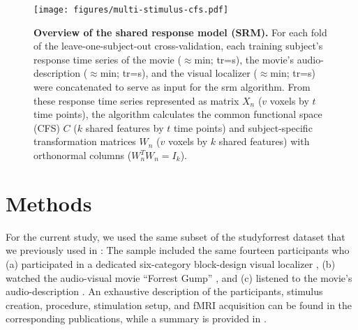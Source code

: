 
\begin{figure*}[tbp]
\centering
\texttt{[image: figures/multi-stimulus-cfs.pdf]}
\caption{
%
    \textbf{Overview of the shared response model (SRM).
}
    For each fold of the leave-one-subject-out cross-validation, each training
    subject's response time series of
    the movie ($\approx$\unit[120]{min}; \ac{tr}=\unit[2]{s}),
    the movie's audio-description ($\approx$\unit[120]{min};
    \ac{tr}=\unit[2]{s}),
    and the visual localizer ($\approx$\unit[21]{min}; \ac{tr}=\unit[2]{s})
    were concatenated to serve as input for the \ac{srm} algorithm.
    From these response time series represented as matrix $X_{n}$ ({$v$} voxels
    by $t$ time points), the algorithm calculates the common functional
    space (CFS) $C$ ($k$ shared features by $t$ time points) and
    subject-specific transformation matrices $W_{n}$
    ($v$ voxels by $k$ shared features) with orthonormal columns
    ($W_{n}^{T}W_{n}=I_{k}$).
} \label{fig:multi-stimulus-cfs} \end{figure*}





\section{Methods}


For the current study, we used the same subset of the studyforrest dataset that
we previously used in \citet{haeusler2022processing}:
%
The sample included the same fourteen participants who
(a) participated in a dedicated six-category block-design visual localizer
\citep{sengupta2016extension},
(b) watched the audio-visual movie ``Forrest Gump''
\citep{hanke2016simultaneous}, and
(c) listened to the movie's audio-description \citep{hanke2014audiomovie}.
An exhaustive description of the participants, stimulus creation, procedure,
stimulation setup, and fMRI acquisition can be found in the corresponding
publications, while a summary is provided in \citet{haeusler2022processing}.



